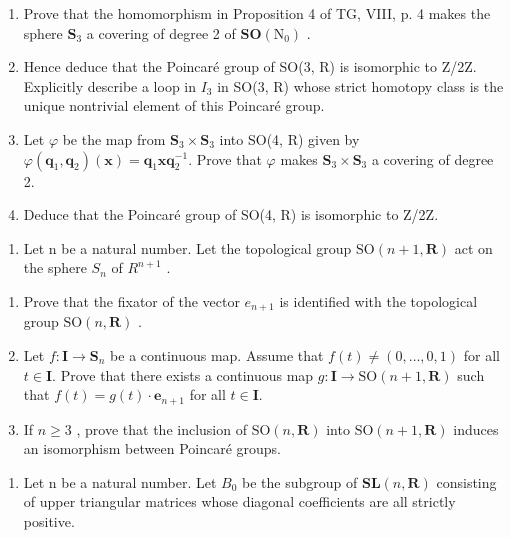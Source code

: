 \begin{enumerate}
\def\labelenumi{\alph{enumi})}
\item
  Prove that the homomorphism in Proposition 4 of TG, VIII, p. 4 makes the sphere \(\mathbf{S}_3\) a covering of degree 2 of \(\mathbf{SO}(\mathrm{N}_0)\) .
\item
  Hence deduce that the Poincaré group of SO(3, R) is isomorphic to Z/2Z. Explicitly describe a loop in \(I_{3}\) in SO(3, R) whose strict homotopy class is the unique nontrivial element of this Poincaré group.
\item
  Let \(\varphi\) be the map from \(\mathbf{S}_3 \times \mathbf{S}_3\) into SO(4, R) given by \(\varphi(\mathbf{q}_1, \mathbf{q}_2)(\mathbf{x}) = \mathbf{q}_1 \mathbf{x} \mathbf{q}_2^{-1}\). Prove that \(\varphi\) makes \(\mathbf{S}_3 \times \mathbf{S}_3\) a covering of degree 2.
\item
  Deduce that the Poincaré group of SO(4, R) is isomorphic to Z/2Z.
\end{enumerate}

\begin{enumerate}
\def\labelenumi{\arabic{enumi})}
\setcounter{enumi}{2}
\tightlist
\item
  Let n be a natural number. Let the topological group \(\mathrm{SO}(n+1,\mathbf{R})\) act on the sphere \(S_{n}\) of \(R^{n+1}\) .
\end{enumerate}

\begin{enumerate}
\def\labelenumi{\alph{enumi})}
\item
  Prove that the fixator of the vector \(e_{n+1}\) is identified with the topological group \(\mathrm{SO}(n,\mathbf{R})\) .
\item
  Let \(f \colon \mathbf{I} \to \mathbf{S}_n\) be a continuous map. Assume that \(f(t) \neq (0, \ldots, 0, 1)\) for all \(t \in \mathbf{I} .\) Prove that there exists a continuous map \(g \colon \mathbf{I} \to \mathrm{SO}(n + 1, \mathbf{R})\) such that \(f(t) = g(t) \cdot \mathbf{e}_{n+1}\) for all \(t \in \mathbf{I} \).
\item
  If \(n \geqslant 3\) , prove that the inclusion of \(\mathrm{SO}(n, \mathbf{R})\) into \(\mathrm{SO}(n+1, \mathbf{R})\) induces an isomorphism between Poincaré groups.
\end{enumerate}

\begin{enumerate}
\def\labelenumi{\arabic{enumi})}
\setcounter{enumi}{3}
\tightlist
\item
  Let n be a natural number. Let \(B_{0}\) be the subgroup of \(\mathbf{SL}(n,\mathbf{R})\) consisting of upper triangular matrices whose diagonal coefficients are all strictly positive.
\end{enumerate}

